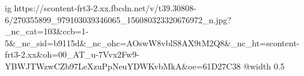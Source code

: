  
 
 
 
 

\ifcmt
  ig https://scontent-frt3-2.xx.fbcdn.net/v/t39.30808-6/270355899_979103039346065_156080323320676972_n.jpg?_nc_cat=103&ccb=1-5&_nc_sid=b9115d&_nc_ohc=AOswW8vblS8AX9tM2Q8&_nc_ht=scontent-frt3-2.xx&oh=00_AT_u-7Vvx2Fw9-YBWJTWzwCZb97LeXzuPpNeuYDWKvbMkA&oe=61D27C38
  @width 0.5
\fi
